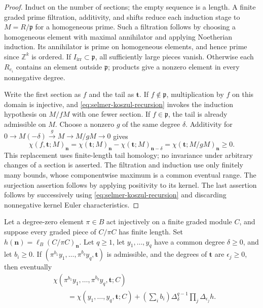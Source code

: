 \begin{proof}
Induct on the number of sections; the empty sequence is a length.
A finite graded prime filtration, additivity, and shifts reduce each
induction stage to $M=R/\mathfrak p$ for a homogeneous prime.
Such a filtration follows by choosing a homogeneous element with maximal
annihilator and applying Noetherian induction. Its annihilator is prime
on homogeneous elements, and hence prime since $\mathbb Z^k$ is ordered.
If $I_{\mathrm{irr}}\subset\mathfrak p$, all sufficiently large pieces
vanish. Otherwise each $R_{e_i}$ contains an element outside
$\mathfrak p$; products give a nonzero element in every nonnegative degree.

Write the first section as $f$ and the tail as $\boldsymbol t$.
If $f\notin\mathfrak p$, multiplication by $f$ on this domain is
injective, and \eqref{eq:selmer-koszul-recursion} invokes the induction
hypothesis on $M/fM$ with one fewer section. If $f\in\mathfrak p$, the
tail is already admissible on $M$. Choose a nonzero $g$ of the same
degree $\delta$. Additivity for
$0\to M(-\delta)\xrightarrow{g}M\to M/gM\to0$ gives
\[
 \chi(f,\boldsymbol t;M)_{\boldsymbol n}
 =\chi(\boldsymbol t;M)_{\boldsymbol n}
  -\chi(\boldsymbol t;M)_{\boldsymbol n-\delta}
 =\chi(\boldsymbol t;M/gM)_{\boldsymbol n}\ge0.
\]
This replacement uses finite-length tail homology; no invariance under
arbitrary changes of a section is asserted. The filtration and induction
use only finitely many bounds, whose componentwise maximum is a common
eventual range. The surjection assertion follows by applying positivity
to its kernel. The last assertion follows by successively using
\eqref{eq:selmer-koszul-recursion} and discarding nonnegative kernel
Euler characteristics.
\end{proof}

\begin{proposition}
\label{prop:selmer-koszul-scalar}
Let a degree-zero element $\pi\in B$ act injectively on a finite graded
module $C$, and suppose every graded piece of $C/\pi C$ has finite length.
Set $h(\boldsymbol n)=\ell_B(C/\pi C)_{\boldsymbol n}$. Let $q\ge1$,
let $y_1,\ldots,y_q$ have a common degree $\delta\ge0$, and let
$b_i\ge0$. If $(\pi^{b_1}y_1,\ldots,\pi^{b_q}y_q,\boldsymbol t)$
is admissible, and the degrees of $\boldsymbol t$ are $\epsilon_j\ge0$,
then eventually
\begin{align*}
 &\chi(\pi^{b_1}y_1,\ldots,\pi^{b_q}y_q,\boldsymbol t;C)\\
 &\qquad=\chi(y_1,\ldots,y_q,\boldsymbol t;C)
  +\left(\sum_i b_i\right)
   \Delta_\delta^{q-1}\prod_j\Delta_{\epsilon_j}h.
\end{align*}
\end{proposition}

